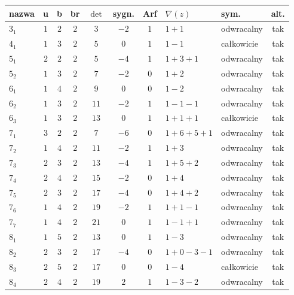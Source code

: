\renewcommand*{\arraystretch}{1.4}
\footnotesize
\begin{longtable}{lccccccllc}
\hline
nazwa & u & b & br & $\det$ & sygn. & Arf & $\nabla(z)$ & sym. & alt. \\ \hline
\endhead %
$3_{1}$    & $1$   & $2$ & $2$ & $3$   & $-2$ & $1$ & $1+1$         & odwracalny & tak \\
$4_{1}$    & $1$   & $3$ & $2$ & $5$   & $0$  & $1$ & $1-1$         & całkowicie & tak \\
$5_{1}$    & $2$   & $2$ & $2$ & $5$   & $-4$ & $1$ & $1+3+1$       & odwracalny & tak \\
$5_{2}$    & $1$   & $3$ & $2$ & $7$   & $-2$ & $0$ & $1+2$         & odwracalny & tak \\
$6_{1}$    & $1$   & $4$ & $2$ & $9$   & $0$  & $0$ & $1-2$         & odwracalny & tak \\
$6_{2}$    & $1$   & $3$ & $2$ & $11$  & $-2$ & $1$ & $1-1-1$       & odwracalny & tak \\
$6_{3}$    & $1$   & $3$ & $2$ & $13$  & $0$  & $1$ & $1+1+1$       & całkowicie & tak \\
$7_{1}$    & $3$   & $2$ & $2$ & $7$   & $-6$ & $0$ & $1+6+5+1$     & odwracalny & tak \\
$7_{2}$    & $1$   & $4$ & $2$ & $11$  & $-2$ & $1$ & $1+3$         & odwracalny & tak \\
$7_{3}$    & $2$   & $3$ & $2$ & $13$  & $-4$ & $1$ & $1+5+2$       & odwracalny & tak \\
$7_{4}$    & $2$   & $4$ & $2$ & $15$  & $-2$ & $0$ & $1+4$         & odwracalny & tak \\
$7_{5}$    & $2$   & $3$ & $2$ & $17$  & $-4$ & $0$ & $1+4+2$       & odwracalny & tak \\
$7_{6}$    & $1$   & $4$ & $2$ & $19$  & $-2$ & $1$ & $1+1-1$       & odwracalny & tak \\
$7_{7}$    & $1$   & $4$ & $2$ & $21$  & $0$  & $1$ & $1-1+1$       & odwracalny & tak \\
$8_{1}$    & $1$   & $5$ & $2$ & $13$  & $0$  & $1$ & $1-3$         & odwracalny & tak \\
$8_{2}$    & $2$   & $3$ & $2$ & $17$  & $-4$ & $0$ & $1+0-3-1$     & odwracalny & tak \\
$8_{3}$    & $2$   & $5$ & $2$ & $17$  & $0$  & $0$ & $1-4$         & całkowicie & tak \\
$8_{4}$    & $2$   & $4$ & $2$ & $19$  & $2$  & $1$ & $1-3-2$       & odwracalny & tak \\

\end{longtable}
